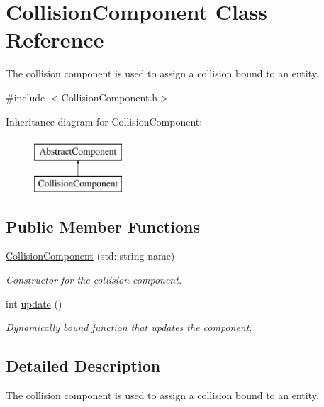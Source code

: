 \hypertarget{class_collision_component}{\section{Collision\-Component Class Reference}
\label{d7/db6/class_collision_component}
}


The collision component is used to assign a collision bound to an entity.  




{\ttfamily \#include $<$Collision\-Component.\-h$>$}

Inheritance diagram for Collision\-Component\-:\begin{figure}[H]
\begin{center}
\leavevmode
\includegraphics[height=2.000000cm]{d7/db6/class_collision_component}
\end{center}
\end{figure}
\subsection*{Public Member Functions}
\begin{DoxyCompactItemize}
\item 
\hyperlink{class_collision_component_a2e6dcebc033b2d63d3ed685506232f1d}{Collision\-Component} (std\-::string name)
\begin{DoxyCompactList}\small\item\em Constructor for the collision component. \end{DoxyCompactList}\item 
\hypertarget{class_collision_component_a03f6ad68a39a5f7df79d5ed3e85a31eb}{int \hyperlink{class_collision_component_a03f6ad68a39a5f7df79d5ed3e85a31eb}{update} ()}\label{d7/db6/class_collision_component_a03f6ad68a39a5f7df79d5ed3e85a31eb}

\begin{DoxyCompactList}\small\item\em Dynamically bound function that updates the component. \end{DoxyCompactList}\end{DoxyCompactItemize}


\subsection{Detailed Description}
The collision component is used to assign a collision bound to an entity. 

